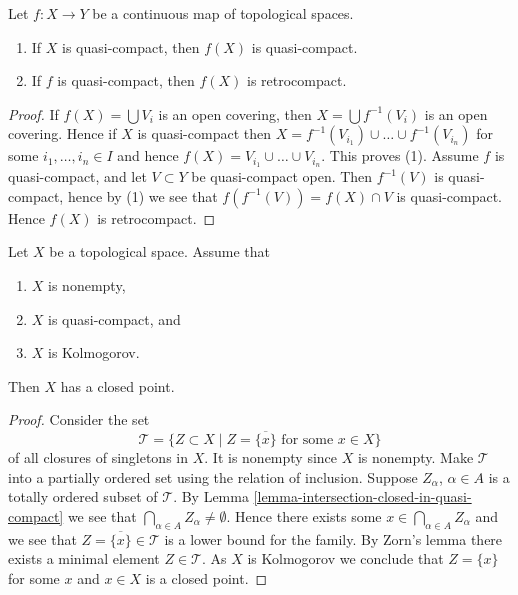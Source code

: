 \begin{lemma}
\label{lemma-image-quasi-compact}
Let $f : X \to Y$ be a continuous map of topological spaces.
\begin{enumerate}
\item If $X$ is quasi-compact, then $f(X)$ is quasi-compact.
\item If $f$ is quasi-compact, then $f(X)$ is retrocompact.
\end{enumerate}
\end{lemma}

\begin{proof}
If $f(X) = \bigcup V_i$ is an open covering, then $X = \bigcup f^{-1}(V_i)$
is an open covering. Hence if $X$ is quasi-compact then
$X = f^{-1}(V_{i_1}) \cup \ldots \cup f^{-1}(V_{i_n})$ for some
$i_1, \ldots, i_n \in I$ and hence
$f(X) = V_{i_1} \cup \ldots \cup V_{i_n}$. This proves (1).
Assume $f$ is quasi-compact, and let $V \subset Y$ be quasi-compact open.
Then $f^{-1}(V)$ is quasi-compact, hence by (1) we see that
$f(f^{-1}(V)) = f(X) \cap V$ is quasi-compact. Hence $f(X)$
is retrocompact.
\end{proof}

\begin{lemma}
\label{lemma-quasi-compact-closed-point}
Let $X$ be a topological space. Assume that
\begin{enumerate}
\item $X$ is nonempty,
\item $X$ is quasi-compact, and
\item $X$ is Kolmogorov.
\end{enumerate}
Then $X$ has a closed point.
\end{lemma}

\begin{proof}
Consider the set
$$
\mathcal{T} =
\{Z \subset X \mid Z = \overline{\{x\}} \text{ for some }x \in X\}
$$
of all closures of singletons in $X$. It is nonempty since $X$ is
nonempty. Make $\mathcal{T}$ into a
partially ordered set using the relation of inclusion.
Suppose $Z_\alpha$, $\alpha \in A$ is a totally ordered subset of $\mathcal{T}$.
By Lemma \ref{lemma-intersection-closed-in-quasi-compact} we see
that $\bigcap_{\alpha \in A} Z_\alpha \not = \emptyset$. Hence there exists
some $x \in \bigcap_{\alpha \in A} Z_\alpha$ and we see that
$Z = \overline{\{x\}}\in \mathcal{T}$ is a lower bound for
the family. By Zorn's lemma there exists a minimal element
$Z \in \mathcal{T}$. As $X$ is Kolmogorov we conclude that
$Z = \{x\}$ for some $x$ and $x \in X$ is a closed point.
\end{proof}

